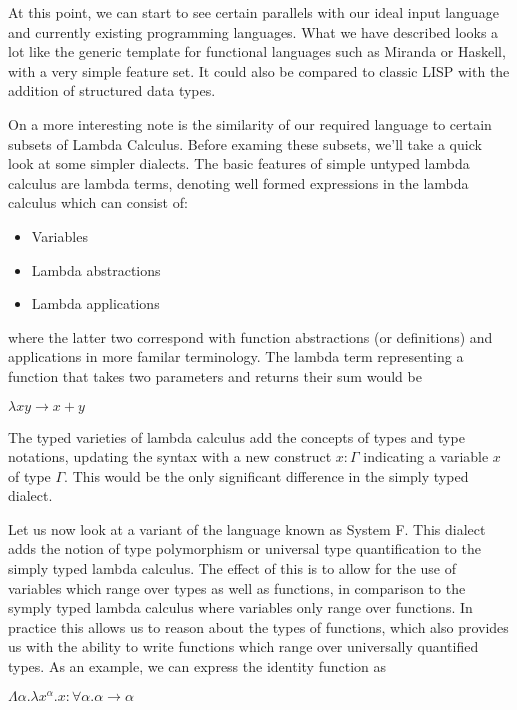 \documentclass[11pt]{article}
\begin{document}
At this point, we can start to see certain parallels with our ideal input
language and currently existing programming languages. What we have described
looks a lot like the generic template for functional languages such as Miranda
or Haskell, with a very simple feature set. It could also be compared to 
classic LISP with the addition of structured data types. 

On a more interesting note is the similarity of our required language to
certain subsets of Lambda Calculus. Before examing these subsets, we'll
take a quick look at some simpler dialects. The basic
features of simple untyped lambda calculus are lambda terms, denoting well formed expressions in the lambda calculus which can consist of:

\begin{itemize}
\item Variables
\item Lambda abstractions
\item Lambda applications
\end{itemize}

\noindent where the latter two correspond with function abstractions (or
definitions) and applications in more familar terminology. The lambda term
representing a function that takes two parameters and returns their sum 
would be 

\begin{center} 
	\( \lambda x y \rightarrow x + y \)
\end{center}

\noindent The typed varieties of lambda calculus add the concepts of types and type
notations, updating the syntax with a new construct \(x:\Gamma \) indicating
a variable \(x\) of type \(\Gamma\). This would be the only significant 
difference in the simply typed dialect. 

Let us now look at a variant of the language known as System F. This dialect
adds the notion of type polymorphism or universal type quantification to 
the simply typed lambda calculus. The effect of this is to allow for the
use of variables which range over types as well as functions, in comparison
to the symply typed lambda calculus where variables only range over functions.
In practice this allows us to reason about the types of functions, which also
provides us with the ability to write functions which range over universally
quantified types. As an example, we can express the identity function as

\begin{center}
 \( \Lambda \alpha . \lambda x^\alpha . x : \forall \alpha . \alpha \rightarrow \alpha  \)
\end{center}
\end{document}
